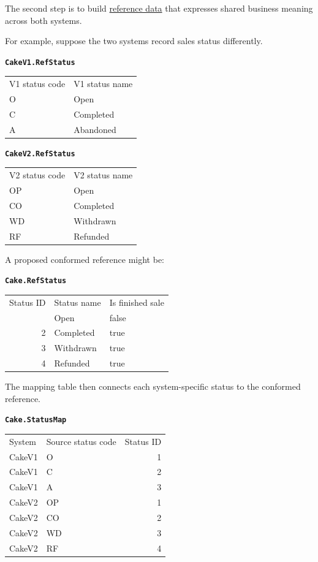 \documentclass[10pt,openany,10pt]{book}
\newcounter{none}
\let\podeToprule\toprule
\let\podeMidrule\midrule
\let\podeBottomrule\bottomrule
\renewcommand{\toprule}{\arrayrulecolor{pbiGrid}\podeToprule}
\renewcommand{\midrule}{\arrayrulecolor{pbiGrid}\podeMidrule}
\renewcommand{\bottomrule}{\arrayrulecolor{pbiGrid}\podeBottomrule}
\begin{document}
The second step is to build
\hyperref[docs-creating-information-reference-data]{reference data} that
expresses shared business meaning across both systems.

For example, suppose the two systems record sales status differently.

\textbf{\texttt{CakeV1.RefStatus}}

{\def\LTcaptype{none} %
\begin{longtable}[]{@{}ll@{}}
\toprule\noalign{}
V1 status code & V1 status name \\
\midrule\noalign{}
\endhead
\bottomrule\noalign{}
\endlastfoot
O & Open \\
C & Completed \\
A & Abandoned \\
\end{longtable}
}

\textbf{\texttt{CakeV2.RefStatus}}

{\def\LTcaptype{none} %
\begin{longtable}[]{@{}ll@{}}
\toprule\noalign{}
V2 status code & V2 status name \\
\midrule\noalign{}
\endhead
\bottomrule\noalign{}
\endlastfoot
OP & Open \\
CO & Completed \\
WD & Withdrawn \\
RF & Refunded \\
\end{longtable}
}

A proposed conformed reference might be:

\textbf{\texttt{Cake.RefStatus}}

{\def\LTcaptype{none} %
\begin{longtable}[]{@{}rll@{}}
\toprule\noalign{}
Status ID & Status name & Is finished sale \\
\midrule\noalign{}
\endhead
\bottomrule\noalign{}
\endlastfoot
1 & Open & false \\
2 & Completed & true \\
3 & Withdrawn & true \\
4 & Refunded & true \\
\end{longtable}
}

The mapping table then connects each system-specific status to the
conformed reference.

\textbf{\texttt{Cake.StatusMap}}

{\def\LTcaptype{none} %
\begin{longtable}[]{@{}llr@{}}
\toprule\noalign{}
System & Source status code & Status ID \\
\midrule\noalign{}
\endhead
\bottomrule\noalign{}
\endlastfoot
CakeV1 & O & 1 \\
CakeV1 & C & 2 \\
CakeV1 & A & 3 \\
CakeV2 & OP & 1 \\
CakeV2 & CO & 2 \\
CakeV2 & WD & 3 \\
CakeV2 & RF & 4 \\
\end{longtable}
}
\end{document}
